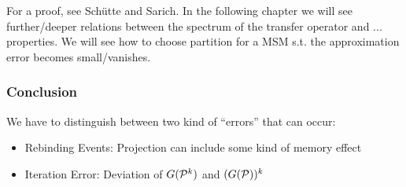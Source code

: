 For a proof, see Sch\"utte and Sarich\cite[p.72]{schutte2013metastability}.
In the following chapter we will see further/deeper relations between the spectrum of the transfer operator and ... properties.
We will see how to choose partition for a MSM s.t. the approximation error becomes small/vanishes. 

\subsubsection*{Conclusion}


We have to distinguish between two kind of ``errors'' that can occur:
\begin{itemize}
\item Rebinding Events: Projection can include some kind of memory effect
\item Iteration Error: Deviation of $G(\mathcal{P}^k)$ and $(G(\mathcal{P}))^k$
\end{itemize}